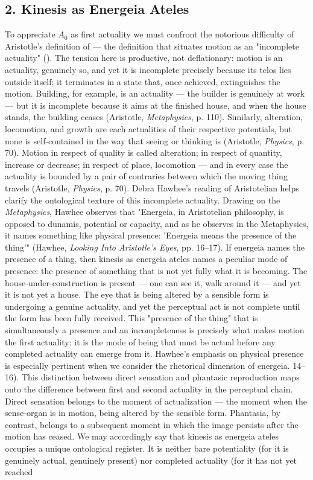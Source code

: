 \subsection*{2. Kinesis as Energeia Ateles}

To appreciate $A_0$ as first actuality we must confront the notorious difficulty of Aristotle's definition of  --- the definition that situates motion as an "incomplete actuality" (). The tension here is productive, not deflationary: motion is an actuality, genuinely so, and yet it is incomplete precisely because its telos lies outside itself; it terminates in a state that, once achieved, extinguishes the motion. Building, for example, is an actuality --- the builder is genuinely at work --- but it is incomplete because it aims at the finished house, and when the house stands, the building ceases (Aristotle, \textit{Metaphysics}, p. 110). Similarly, alteration, locomotion, and growth are each actualities of their respective potentials, but none is self-contained in the way that seeing or thinking is (Aristotle, \textit{Physics}, p. 70). Motion in respect of quality is called alteration; in respect of quantity, increase or decrease; in respect of place, locomotion --- and in every case the actuality is bounded by a pair of contraries between which the moving thing travels (Aristotle, \textit{Physics}, p. 70). Debra Hawhee's reading of Aristotelian  helps clarify the ontological texture of this incomplete actuality. Drawing on the \textit{Metaphysics}, Hawhee observes that "Energeia, in Aristotelian philosophy, is opposed to dunamis, potential or capacity, and as he observes in the Metaphysics, it names something like physical presence: 'Energeia means the presence of the thing'" (Hawhee, \textit{Looking Into Aristotle's Eyes}, pp. 16--17). If energeia names the presence of a thing, then kinesis as energeia ateles names a peculiar mode of presence: the presence of something that is not yet fully what it is becoming. The house-under-construction is present --- one can see it, walk around it --- and yet it is not yet a house. The eye that is being altered by a sensible form is undergoing a genuine actuality, and yet the perceptual act is not complete until the form has been fully received. This "presence of the thing" that is simultaneously a presence and an incompleteness is precisely what makes motion the first actuality: it is the mode of being that must be actual before any completed actuality can emerge from it. Hawhee's emphasis on physical presence is especially pertinent when we consider the rhetorical dimension of energeia. 14--16). This distinction between direct sensation and phantasic reproduction maps onto the difference between first and second actuality in the perceptual chain. Direct sensation belongs to the moment of actualization --- the moment when the sense-organ is in motion, being altered by the sensible form. Phantasia, by contrast, belongs to a subsequent moment in which the image persists after the motion has ceased. We may accordingly say that kinesis as energeia ateles occupies a unique ontological register. It is neither bare potentiality (for it is genuinely actual, genuinely present) nor completed actuality (for it has not yet reached 